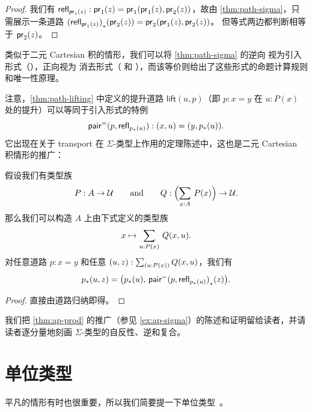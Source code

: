 \begin{proof}
  我们有 $\mathsf{refl}_{\mathsf{pr}_{1}(z)} : \mathsf{pr}_{1}(z) = \mathsf{pr}_{1}(\mathsf{pr}_{1}(z),\mathsf{pr}_{2}(z))$，故由 \cref{thm:path-sigma}，只需展示一条道路 ${(\mathsf{refl}_{\mathsf{pr}_{1}(z)})}_{*}\mathopen{}\left({\mathsf{pr}_{2}(z)}\right)\mathclose{} = \mathsf{pr}_{2}(\mathsf{pr}_{1}(z),\mathsf{pr}_{2}(z))$。
  但等式两边都判断相等于 $\mathsf{pr}_{2}(z)$。
\end{proof}

类似于二元 Cartesian 积的情形，我们可以将
\cref{thm:path-sigma} 的逆向
视为引入形式（\pairpath{}{}），正向视为
消去形式（ 和 ），而该等价则给出了这些形式的命题计算规则和唯一性原理。

注意，\cref{thm:path-lifting} 中定义的提升道路 $\mathsf{lift}(u,p)$（即 $p:x=y$ 在 $u:P(x)$ 处的提升）可以等同于引入形式的特例
\[\mathsf{pair}^{\mathord{=}}(p,\mathsf{refl}_{{p}_{*}\mathopen{}\left({u}\right)\mathclose{}}):(x,u) = (y,{p}_{*}\mathopen{}\left({u}\right)\mathclose{}).\]
%
它出现在关于 transport 在 $\Sigma$-类型上作用的定理陈述中，这也是二元 Cartesian 积情形的推广：

\begin{thm}\label{transport-Sigma}
  假设我们有类型族
  \begin{equation*}
    P:A\to\type
    \qquad\text{and}\qquad
    Q:\Parens{\sm{x:A} P(x)}\to\type.
  \end{equation*}
  那么我们可以构造 $A$ 上由下式定义的类型族
  \begin{equation*}
    x \mapsto \sm{u:P(x)} Q(x,u).
  \end{equation*}
  对任意道路 $p:x=y$ 和任意 $(u,z):\sm{u:P(x)} Q(x,u)$，我们有
  \begin{equation*}
    {p}_{*}\mathopen{}\left({u,z}\right)\mathclose{}=\big({p}_{*}\mathopen{}\left({u}\right)\mathclose{},\,{\mathsf{pair}^{\mathord{=}}(p,\mathsf{refl}_{{p}_{*}\mathopen{}\left({u}\right)\mathclose{}})}_{*}\mathopen{}\left({z}\right)\mathclose{}\big).
  \end{equation*}
\end{thm}

\begin{proof}
直接由道路归纳即得。
\end{proof}

我们把 \cref{thm:ap-prod} 的推广（参见 \cref{ex:ap-sigma}）的陈述和证明留给读者，并请读者逐分量地刻画 $\Sigma$-类型的自反性、逆和复合。

%

\section{单位类型}
\label{sec:compute-unit}

%
平凡的情形有时也很重要，所以我们简要提一下单位类型~\unit。

